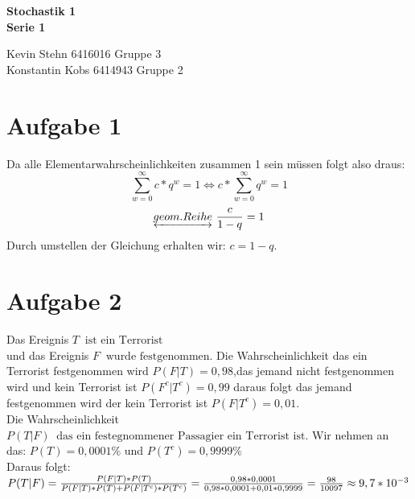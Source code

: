 \documentclass[10pt,a4paper]{article}
\newcommand{\ent}{\mathop{\widehat{=}}}
\begin{document}
\begin{center}
\textbf{Stochastik 1 \\ Serie 1 \\}
\end{center}

\begin{flushright}
Kevin Stehn 6416016 Gruppe 3 \\
Konstantin Kobs 6414943 Gruppe 2
\end{flushright}

\section*{Aufgabe 1}
Da alle Elementarwahrscheinlichkeiten zusammen 1 sein müssen folgt also draus:\\
\[ \sum_{w=0}^\infty c * q^w = 1 \Leftrightarrow  c * \sum_{w=0}^\infty q^w = 1 \]
\[\underleftrightarrow{geom. Reihe} \text{  } \frac{c}{1-q} = 1 \]
Durch umstellen der Gleichung erhalten wir: $c = 1-q$.

\section*{Aufgabe 2}
Das Ereignis $T \ent \text{ist ein Terrorist}$ \\ 
und das Ereignis $F \ent \text{wurde festgenommen}$.
Die Wahrscheinlichkeit das ein Terrorist festgenommen wird $P(F|T) = 0,98 $,das jemand nicht festgenommen wird und kein Terrorist ist $P(F^c|T^c) = 0,99$ daraus folgt das jemand festgenommen wird der kein Terrorist ist $P(F|T^{c})= 0,01 $.\\
Die Wahrscheinlichkeit $P(T|F) \ent \text{das ein festegnommener Passagier ein Terrorist ist}$.
Wir nehmen an das: $P(T) = 0,0001\%$ und $P(T^c)= 0,9999\% $ \\
Daraus folgt:\\
$P(T|F) = \frac{P(F|T)*P(T)}{P(F|T)*P(T) + P(F|T^c) * P(T^c)} = 
\frac{0,98*0,0001}{0,98*0,0001+ 0,01*0,9999} \newline = \frac{98}{10097} \approx 9,7*10^{-3}$
\end{document}
